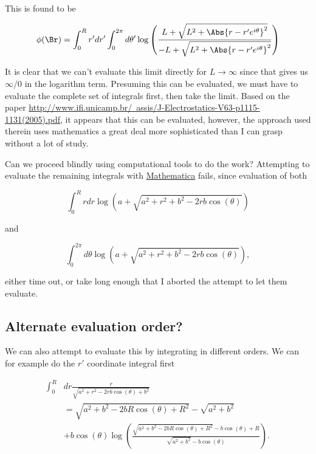 This is found to be

\begin{equation}\label{eqn:cylinderPotential:50}
\phi(\Br) = \int_0^R r' dr' \int_0^{2 \pi } d\theta'
\log\left(\frac
{L+\sqrt{L^2+ \Abs{r - r' e^{ i \theta }}^2}}
{-L+\sqrt{L^2+ \Abs{r - r' e^{ i \theta }}^2}}
\right)
\end{equation}

It is clear that we can't evaluate this limit directly for $L \rightarrow \infty$ since that gives us $\infty/0$ in the logarithm term.  Presuming this can be evaluated, we must have to evaluate the complete set of integrals first, then take the limit.  Based on the paper \href{http://www.ifi.unicamp.br/~assis/J-Electrostatics-V63-p1115-1131(2005).pdf}{http://www.ifi.unicamp.br/~assis/J-Electrostatics-V63-p1115-1131(2005).pdf}, it appears that this can be evaluated, however, the approach used therein uses mathematics a great deal more sophisticated than I can grasp without a lot of study.

Can we proceed blindly using computational tools to do the work?  Attempting to evaluate the remaining integrals with \href{https://raw.github.com/peeterjoot/physicsplay/master/notes/phy354/problemSetIIproblem4IntegralsEvaluatingInfiniteCylindricalPotential.cdf}{Mathematica} fails, since evaluation of both

\begin{equation}\label{eqn:cylinderPotential:70}
\int_0^R r dr \log \left(a+\sqrt{a^2+r^2+b^2-2 r b \cos (\theta )}\right) 
\end{equation}

and

\begin{equation}\label{eqn:cylinderPotential:90}
\int_0^{2 \pi } 
d\theta
\log \left(a+\sqrt{a^2+r^2+b^2-2 r b \cos (\theta )}\right) ,
\end{equation}

either time out, or take long enough that I aborted the attempt to let them evaluate.

\subsection{Alternate evaluation order?}

We can also attempt to evaluate this by integrating in different orders.  We can for example do the $r'$ coordinate integral first

\begin{equation}\label{eqn:cylinderPotential:110}
\begin{aligned}
\int_0^R 
&dr
\frac{r}{\sqrt{a^2+r^2-2 r b \cos (\theta )+b^2}}  \\
&=
\sqrt{a^2+b^2-2 b R \cos (\theta )+R^2} -\sqrt{a^2+b^2} \\
&+
b \cos (\theta ) \log \left(
\frac{
\sqrt{a^2+b^2-2 b R \cos (\theta )+R^2}-b \cos (\theta )+R}
{
\sqrt{a^2+b^2}-b \cos (\theta )
}
\right).
\end{aligned}
\end{equation}

